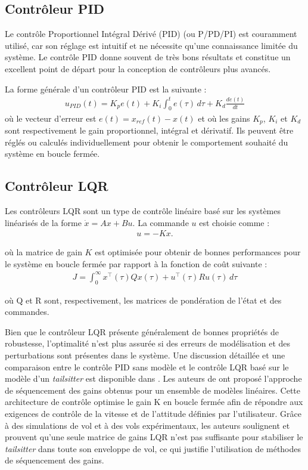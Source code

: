 \subsection*{Contrôleur PID}
\label{sec:PID}
Le contrôle Proportionnel Intégral Dérivé (PID) (ou P/PD/PI) est couramment utilisé, car son réglage est intuitif et ne nécessite qu'une connaissance limitée du système. Le contrôle PID donne souvent de très bons résultats et constitue un excellent point de départ pour la conception de contrôleurs plus avancés.

La forme générale d'un contrôleur PID est la suivante :
\begin{align}
    u_{PID}(t) = K_{p} e(t) + K_{i} \int_{0}^{t} e(\tau) \,d\tau + K_{d} \frac{d e(t)}{dt}
\end{align}
où le vecteur d'erreur est $e(t) = x_{ref} (t) - x(t)$ et où les gains $K_{p}$, $K_{i}$ et $K_{d}$ sont respectivement le gain proportionnel, intégral et dérivatif. Ils peuvent être réglés ou calculés individuellement pour obtenir le comportement souhaité du système en boucle fermée.

\subsection*{Contrôleur LQR}
\label{sec:LQR}
Les contrôleurs LQR sont un type de contrôle linéaire basé sur les systèmes linéarisés de la forme $\dot{x} = Ax+Bu$. La commande $u$ est
choisie comme :
\begin{align*}
    u = -Kx.
\end{align*}

où la matrice de gain $K$ est optimisée pour obtenir de bonnes performances pour le système en boucle fermée par rapport à la fonction de coût suivante :
\begin{align*}
    J = \int_{0}^{\infty} x^{\top}(\tau)Q x(\tau) + u^{\top}(\tau)R u(\tau) \,d\tau
\end{align*}

où Q et R sont, respectivement, les matrices de pondération de l'état et des commandes. 

Bien que le contrôleur LQR présente généralement de bonnes propriétés de robustesse, l'optimalité n'est plus assurée si des erreurs de modélisation et des perturbations sont présentes dans le système. Une discussion détaillée et une comparaison entre le contrôle PID sans modèle et le contrôle LQR basé sur le modèle d'un \textit{tailsitter} est disponible dans \cite{BarthCondomines2018}.
Les auteurs de \cite{Lustosa2017LaP} ont proposé l'approche de séquencement des gains obtenus pour un ensemble de modèles linéaires. Cette architecture de contrôle optimise le gain K en boucle fermée afin de répondre aux exigences de contrôle de la vitesse et de l'attitude définies par l'utilisateur. Grâce à des simulations de vol et à des vols expérimentaux, les auteurs soulignent et prouvent qu'une seule matrice de gains LQR n'est pas suffisante pour stabiliser le \textit{tailsitter} dans toute son enveloppe de vol, ce qui justifie l'utilisation de méthodes de séquencement des gains.


